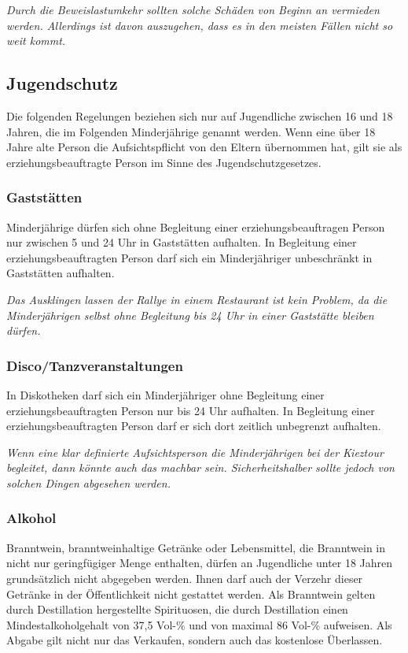 \documentclass[a4paper,11pt]{scrartcl} %
\begin{document}
\textit{Durch die Beweislastumkehr sollten solche Schäden von Beginn an vermieden werden. Allerdings ist davon auszugehen, dass es in den meisten Fällen nicht so weit kommt.}

\subsection{Jugendschutz}

Die folgenden Regelungen beziehen sich nur auf Jugendliche zwischen 16 und 18 Jahren, die im Folgenden Minderjährige genannt werden. Wenn eine über 18 Jahre alte Person die Aufsichtspflicht von den Eltern übernommen hat, gilt sie als erziehungsbeauftragte Person im Sinne des Jugendschutzgesetzes.

\subsubsection*{Gaststätten}

Minderjährige dürfen sich ohne Begleitung einer erziehungsbeauftragen Person nur zwischen 5 und 24 Uhr in Gaststätten aufhalten. In Begleitung einer erziehungsbeauftragten Person darf sich ein Minderjähriger unbeschränkt in Gaststätten aufhalten.

\textit{Das Ausklingen lassen der Rallye in einem Restaurant ist kein Problem, da die Minderjährigen selbst ohne Begleitung bis 24 Uhr in einer Gaststätte bleiben dürfen.}

\subsubsection*{Disco/Tanzveranstaltungen}

In Diskotheken darf sich ein Minderjähriger ohne Begleitung einer erziehungsbeauftragten Person nur bis 24 Uhr aufhalten. In Begleitung einer erziehungsbeauftragten Person darf er sich dort zeitlich unbegrenzt aufhalten.

\textit{Wenn eine klar definierte Aufsichtsperson die Minderjährigen bei der Kieztour begleitet, dann könnte auch das machbar sein. Sicherheitshalber sollte jedoch von solchen Dingen abgesehen werden.}

\subsubsection*{Alkohol}

Branntwein, branntweinhaltige Getränke oder Lebensmittel, die Branntwein in nicht nur geringfügiger Menge enthalten, dürfen an Jugendliche unter 18 Jahren grundsätzlich nicht abgegeben werden. Ihnen darf auch der Verzehr dieser Getränke in der Öffentlichkeit nicht gestattet werden. Als Branntwein gelten durch Destillation hergestellte Spirituosen, die durch Destillation einen Mindestalkoholgehalt von 37,5 Vol-\% und von maximal 86 Vol-\% aufweisen. Als Abgabe gilt nicht nur das Verkaufen, sondern auch das kostenlose Überlassen. 
\end{document}
